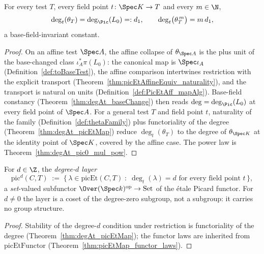 \begin{theorem}
  \label{thm:degAt_thetaFamily}
  \leanok
  For every test \(T\), every field point \(t \colon \Spec K \to T\) and every \(m \in \N\),
  \[
    \deg_t(\theta_T) = \deg_{\Pic}(L_0) =: d_1,
    \qquad
    \deg_t\bigl(\theta_T^{\,m}\bigr) = m \, d_1 ,
  \]
  a base-field-invariant constant.
\end{theorem}
\begin{proof}
  \leanok
  On an affine test \(\Spec A\), the affine collapse of \(\theta_{\Spec A}\) is the plus unit
  of the base-changed class \(\iota_A^{*}\pi(L_0)\): the canonical map is \(\Spec\iota_A\)
  (Definition~\ref{def:toBaseTest}), the affine comparison intertwines restriction with the
  explicit transport (Theorem~\ref{thm:picEtAffineEquiv_naturality}), and the transport is
  natural on units (Definition~\ref{def:PicEtAff_mapAlg}). Base-field constancy
  (Theorem~\ref{thm:degAt_baseChange}) then reads \(\deg = \deg_{\Pic}(L_0)\) at every field
  point of \(\Spec A\). For a general test \(T\) and field point \(t\), naturality of the
  family (Definition~\ref{def:thetaFamily}) plus functoriality of the degree
  (Theorem~\ref{thm:degAt_picEtMap}) reduce \(\deg_t(\theta_T)\) to the degree of
  \(\theta_{\Spec K}\) at the identity point of \(\Spec K\), covered by the affine case.
  The power law is Theorem~\ref{thm:degAt_pic0_mul_pow}.
\end{proof}

\begin{definition}
  \label{def:picDegLayerFunctor}
  \leanok
  For \(d \in \Z\), the \emph{degree-\(d\) layer}
  \[
    \mathrm{pic}^{d}(C,T) \;:=\;
    \bigl\{\, \lambda \in \mathrm{picEt}(C,T) \;:\; \deg_t(\lambda) = d
      \text{ for every field point } t \,\bigr\},
  \]
  a \emph{set}-valued subfunctor \(\Over(\Spec k)^{\mathrm{op}} \to \mathrm{Set}\) of the
  \'etale Picard functor. For \(d \neq 0\) the layer is a coset of the degree-zero subgroup,
  not a subgroup: it carries no group structure.
\end{definition}
\begin{proof}
  \leanok
  Stability of the degree-\(d\) condition under restriction is functoriality of the degree
  (Theorem~\ref{thm:degAt_picEtMap}); the functor laws are inherited from
  \(\mathrm{picEtFunctor}\) (Theorem~\ref{thm:picEtMap_functor_laws}).
\end{proof}


